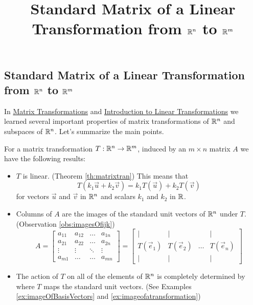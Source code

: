 \documentclass{ximera}
\title{Standard Matrix of a Linear Transformation from $\mathbb{R}^n$ to $\mathbb{R}^m$} \license{CC BY-NC-SA 4.0}
\begin{document}
\begin{abstract}
 \end{abstract}
\maketitle

\begin{onlineOnly}
\section*{Standard Matrix of a Linear Transformation from $\mathbb{R}^n$ to $\mathbb{R}^m$}
\end{onlineOnly}

In \href{\xmbaseurl/LTR-0005/main}{Matrix Transformations} and \href{\xmbaseurl/LTR-0010/main}{Introduction to Linear Transformations} we learned several important properties of matrix transformations of $\mathbb{R}^n$ and subspaces of $\mathbb{R}^n$.  Let's summarize the main points.

\begin{summary}\label{sum:matrixTrans}
For a matrix transformation $T:\mathbb{R}^n\rightarrow\mathbb{R}^m$, induced by an $m\times n$ matrix $A$ we have the following results:
\begin{itemize}
    \item $T$ is linear. (Theorem \ref{th:matrixtran})  This means that 
    $$T(k_1\vec{u}+k_2\vec{v})= k_1T(\vec{u})+k_2T(\vec{v})$$
    for vectors $\vec{u}$ and $\vec{v}$ in $\mathbb{R}^n$ and scalars $k_1$ and $k_2$ in $\mathbb{R}$.
    \item Columns of $A$ are the images of the standard unit vectors of $\mathbb{R}^n$ under $T$. (Observation \ref{obs:imagesOfijk})
 \begin{equation*} \label{eq:matlintrans}
 A=\begin{bmatrix}
           a_{11} & a_{12}&\dots&a_{1n}\\
           a_{21}&a_{22} &\dots &a_{2n}\\
		\vdots & \vdots&\ddots &\vdots\\
		a_{m1}&\dots &\dots &a_{mn}
         \end{bmatrix}
		 = 
         \begin{bmatrix}
           | & |& &|\\
		T(\vec{e}_1) & T(\vec{e}_2)&\dots &T(\vec{e}_n)\\
		|&| & &|
         \end{bmatrix}
\end{equation*}
    
    \item The action of $T$ on all of the elements of $\mathbb{R}^n$ is completely determined by where $T$ maps the standard unit vectors. (See Examples \ref{ex:imageOfBasisVectors} and \ref{ex:imageofatransformation})
\end{itemize}
    
\end{summary}
\end{document}
